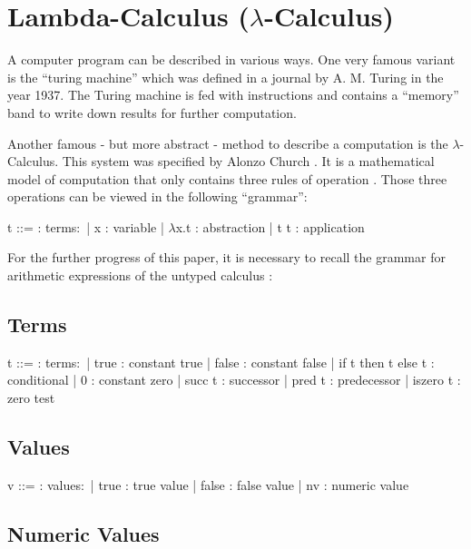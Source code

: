 \section{Lambda-Calculus ($\lambda$-Calculus)}

A computer program can be described in various
ways. One very famous variant is the ``turing machine''
which was defined in a journal \cite{aturingMachine} by
A. M. Turing in the year 1937. The Turing machine
is fed with instructions and contains a ``memory'' band
to write down results for further computation.

Another famous - but more abstract - method to describe
a computation is the $\lambda$-Calculus. This system was
specified by Alonzo Church \cite{churchLambda}. It is a mathematical
model of computation that only contains three rules
of operation \cite{pierce2002ProgLang}.
Those three operations can be viewed in the following ``grammar'':

\begin{bnfgrammar}
    t ::= : terms$\colon$
    | x : variable
    | $\lambda$x.t : abstraction
    | t t : application
\end{bnfgrammar}

For the further progress of this paper, it is necessary to recall
the grammar for arithmetic expressions of the untyped calculus \cite{pierce2002ProgLang}:

\subsection{Terms}

\begin{bnfgrammar}
    t ::= : terms$\colon$
    | true : constant true
    | false : constant false
    | if t then t else t : conditional
    | 0 : constant zero
    | succ t : successor
    | pred t : predecessor
    | iszero t : zero test
\end{bnfgrammar}

\subsection{Values}

\begin{bnfgrammar}
    v ::= : values$\colon$
    | true : true value
    | false : false value
    | nv : numeric value
\end{bnfgrammar}

\subsection{Numeric Values}

